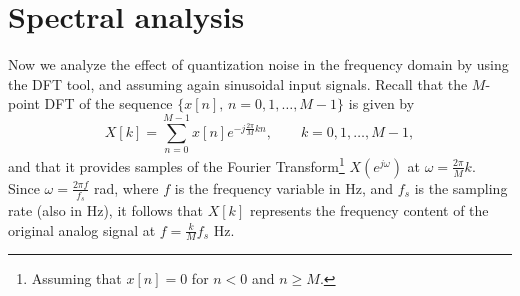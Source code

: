\documentclass[11pt]{article}
\begin{document}
\section{Spectral analysis}

Now we analyze the effect of quantization noise in the frequency domain by using the DFT tool, and assuming again sinusoidal input signals. Recall that the $M$-point DFT of the sequence $\{x[n], \, n=0,1,\ldots, M-1\}$ is given by
\[ X[k] = \sum_{n=0}^{M-1} x[n] e^{-j\frac{2\pi}{M}kn}, \qquad k=0,1,\ldots, M-1,\]
and that it provides samples of the Fourier Transform\footnote{Assuming that $x[n]=0$ for $n<0$ and $n\geq M$.} $X(e^{j\omega})$ at $\omega = \frac{2\pi}{M}k$.
Since $\omega = \frac{2\pi f}{f_s}$ rad, where $f$ is the frequency variable in Hz, and $f_s$ is the sampling rate (also in Hz), it follows that $X[k]$ represents the frequency content of the original analog signal at $f = \frac{k}{M} f_s$ Hz. 
\end{document}
